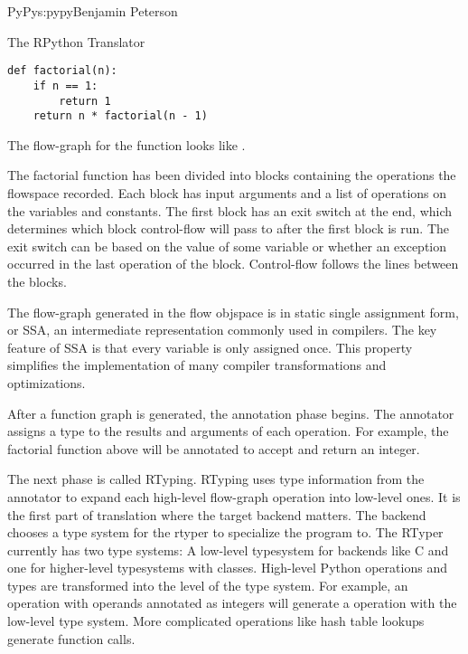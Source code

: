 \begin{aosachapter}{PyPy}{s:pypy}{Benjamin Peterson}
\begin{aosasect1}{The RPython Translator}
\begin{verbatim}
def factorial(n):
    if n == 1:
        return 1
    return n * factorial(n - 1)
\end{verbatim}

\noindent The flow-graph for the function looks like
.


The factorial function has been divided into blocks containing the operations
the flowspace recorded. Each block has input arguments and a list of operations
on the variables and constants. The first block has an exit switch at the end,
which determines which block control-flow will pass to after the first block is
run. The exit switch can be based on the value of some variable or whether an
exception occurred in the last operation of the block. Control-flow follows the
lines between the blocks.

The flow-graph generated in the flow objspace is in static single assignment
form, or SSA, an intermediate representation commonly used in compilers. The key
feature of SSA is that every variable is only assigned once. This property
simplifies the implementation of many compiler transformations and
optimizations.

After a function graph is generated, the annotation phase begins. The annotator
assigns a type to the results and arguments of each operation. For example, the
factorial function above will be annotated to accept and return an integer.

The next phase is called RTyping. RTyping uses type information from the
annotator to expand each high-level flow-graph operation into low-level ones. It
is the first part of translation where the target backend matters. The backend
chooses a type system for the rtyper to specialize the program to. The RTyper
currently has two type systems: A low-level typesystem for backends like C and
one for higher-level typesystems with classes. High-level Python operations and
types are transformed into the level of the type system. For example, an
 operation with operands annotated as integers will generate a
 operation with the low-level type system. More complicated
operations like hash table lookups generate function calls.


\end{aosasect1}
\end{aosachapter}
